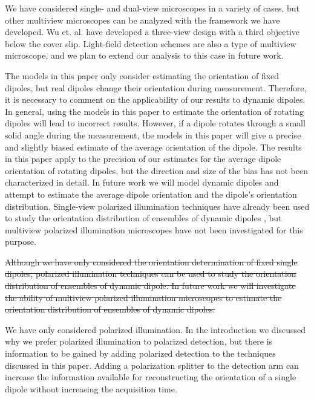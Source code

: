 \documentclass[10pt]{article}
\begin{document}
We have considered single- and dual-view microscopes in a variety of cases, but
other multiview microscopes can be analyzed with the framework we have
developed. Wu et. al. have developed a three-view design with a third objective
below the cover slip\cite{wu2016}. Light-field detection schemes are also a type
of multiview microscope\cite{levoy2006}, and we plan to extend our analysis to
this case in future work.

\hypertarget{temporal}{{\color{urlblue} The models in this paper only consider
    estimating the orientation of fixed dipoles, but real dipoles change their
    orientation during measurement. Therefore, it is necessary to comment on the
    applicability of our results to dynamic dipoles. In general, using the
    models in this paper to estimate the orientation of rotating dipoles will
    lead to incorrect results. However, if a dipole rotates through a small
    solid angle during the measurement, the models in this paper will give a
    precise and slightly biased estimate of the average orientation of the
    dipole. The results in this paper apply to the precision of our estimates
    for the average dipole orientation of rotating dipoles, but the direction
    and size of the bias has not been characterized in detail. In future work we
    will model dynamic dipoles and attempt to estimate the average dipole
    orientation and the dipole's orientation distribution. Single-view polarized
    illumination techniques have already been used to study the orientation
    distribution of ensembles of dynamic dipoles \cite{mehta2016, backer2016},
    but multiview polarized illumination microscopes have not been investigated
    for this purpose.}}

{\color{red}\sout{Although we have only considered the orientation determination
    of fixed single dipoles, polarized illumination techniques can be used to
    study the orientation distribution of ensembles of dynamic dipole. In future
    work we will investigate the ability of multiview polarized illumination
    microscopes to estimate the orientation distribution of ensembles of dynamic
    dipoles.}}

We have only considered polarized illumination. In the introduction
we discussed why we prefer polarized illumination to polarized detection, but
there is information to be gained by adding polarized detection to the
techniques discussed in this paper. Adding a polarization splitter to the
detection arm can increase the information available for reconstructing the
orientation of a single dipole without increasing the acquisition time.
\end{document}
